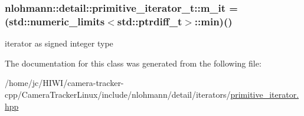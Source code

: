\subsubsection[{\texorpdfstring{m\+\_\+it}{m_it}}]{ nlohmann\+::detail\+::primitive\+\_\+iterator\+\_\+t\+::m\+\_\+it = (std\+::numeric\+\_\+limits$<$std\+::ptrdiff\+\_\+t$>$\+::min)()\hspace{0.3cm}{\ttfamily [private]}}\hypertarget{classnlohmann_1_1detail_1_1primitive__iterator__t_a4357355113b0cd7e12b15c2e93703510}{}\label{classnlohmann_1_1detail_1_1primitive__iterator__t_a4357355113b0cd7e12b15c2e93703510}


iterator as signed integer type 



The documentation for this class was generated from the following file\+:\begin{DoxyCompactItemize}
\item 
/home/jc/\+H\+I\+W\+I/camera-\/tracker-\/cpp/\+Camera\+Tracker\+Linux/include/nlohmann/detail/iterators/\hyperlink{primitive__iterator_8hpp}{primitive\+\_\+iterator.\+hpp}\end{DoxyCompactItemize}
